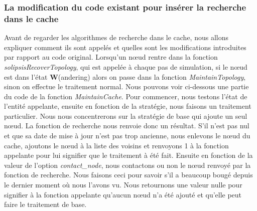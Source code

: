 \subsubsection{La modification du code existant pour insérer la recherche dans le cache}

 Avant de regarder les algorithmes de recherche dans le cache, nous allons expliquer comment ils sont appelés et quelles sont les modifications introduites par rapport au code original. Lorsqu'un nœud rentre dans la fonction \textit{solipsisRecoverTopology}, qui est appelée à chaque pas de simulation, si le nœud est dans l'état \textbf{W}(andering) alors on passe dans la fonction \textit{MaintainTopology}, sinon on effectue le traitement normal. Nous pouvons voir ci-dessous une partie du code de la fonction \textit{MaintainCache}. Pour commencer, nous testons l'état de l'entité appelante, ensuite en fonction de la stratégie, nous faisons un traitement particulier. Nous nous concentrerons sur la stratégie de base qui ajoute un seul nœud. La fonction de recherche nous renvoie donc un résultat. S'il n'est pas nul et que sa date de mise à jour n'est pas trop ancienne, nous enlevons le nœud du cache, ajoutons le nœud à la liste des voisins et renvoyons 1 à la fonction appelante pour lui signifier que le traitement à été fait. Ensuite en fonction de la valeur de l'option \textit{contact\_node}, nous contactons ou non le nœud renvoyé par la fonction de recherche. Nous faisons ceci pour savoir s'il a beaucoup bougé depuis le dernier moment où nous l'avons vu. Nous retournons une valeur nulle pour signifier à la fonction appelante qu'aucun nœud n'a été ajouté et qu'elle peut faire le traitement de base.

\lstset{numbers=left,basicstyle=\scriptsize, numberstyle=\tiny, stepnumber=5, numbersep=5pt}






